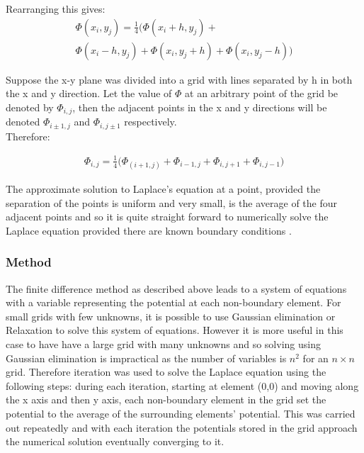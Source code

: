 \documentclass[aps,twocolumn,pre,nofootinbib,10pt]{revtex4-1}
\begin{document}
Rearranging this gives:
\begin{gather*}
\Phi(x_i,y_j)=\frac{1}{4}\Bigg(\Phi(x_i+h,y_j)+ \\
\Phi(x_i-h,y_j)+\Phi(x_i,y_j+h)+\Phi(x_i,y_j-h)\Bigg)
\end{gather*}

Suppose the x-y plane was divided into a grid with lines separated by h in both the x and y direction. Let the value of \(\Phi\) at an arbitrary point of the grid be denoted by \(\Phi_{i,j}\), then the adjacent points in the x and y directions will be denoted \(\Phi_{i\pm1,j}\) and \(\Phi_{i,j\pm1}\) respectively.\\Therefore:

\begin{gather*}
\Phi_{i,j}=\frac{1}{4}\Bigg(\Phi_{(i+1,j)}+
\Phi_{i-1,j}+\Phi_{i,j+1}+\Phi_{i,j-1}\Bigg)
\end{gather*}

The approximate solution to Laplace's equation at a point, provided the separation of the points is uniform and very small, is the average of the four adjacent points and so it is quite straight forward to numerically solve the Laplace equation provided there are known boundary conditions \cite{compmethods}.

\subsubsection{Method}

The finite difference method as described above leads to a system of equations with a variable representing the potential at each non-boundary element. For small grids with few unknowns, it is possible to use Gaussian elimination or Relaxation \cite{recipes_c} to solve this system of equations. However it is more useful in this case to have have a large grid with many unknowns and so solving using Gaussian elimination is impractical as the number of variables is \(n^2\) for an \(n \times n\) grid. Therefore iteration was used to solve the Laplace equation using the following steps: during each iteration, starting at element (0,0) and moving along the x axis and then y axis, each non-boundary element in the grid set the potential to the average of the surrounding elements' potential. This was carried out repeatedly and with each iteration the potentials stored in the grid approach the numerical solution eventually converging to it.
\end{document}
